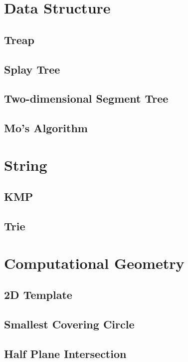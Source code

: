 \documentclass[10pt,UTF8,a4paper,twoside]{ctexart}
\begin{document}
\begin{multicols}{2}
\section{Data Structure}
	\subsection{Treap}
		
	\subsection{Splay Tree}
	\subsection{Two-dimensional Segment Tree}
	\subsection{Mo's Algorithm}
		
\clearpage

\section{String}
	\subsection{KMP}
		
	\subsection{Trie}
		
\clearpage

\section{Computational Geometry}
	\subsection{2D Template}
		
	\subsection{Smallest Covering Circle}
		
	\subsection{Half Plane Intersection}
		
\clearpage


\end{multicols}
\end{document}
